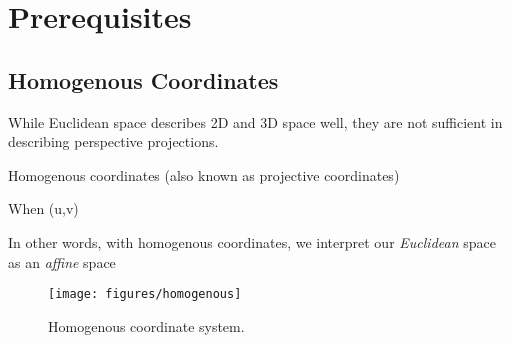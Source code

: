 \section{Prerequisites}

\subsection{Homogenous Coordinates} \label{sec:homogenous}

While Euclidean space describes 2D and 3D space well, they are not sufficient in describing perspective projections.


Homogenous coordinates (also known as projective coordinates)

When
(u,v)


In other words, with homogenous coordinates, we interpret our \emph{Euclidean} space as an \emph{affine} space

\begin{figure}[H]
    \centering
    \texttt{[image: figures/homogenous]}
    \caption{Homogenous coordinate system.}
\end{figure}
